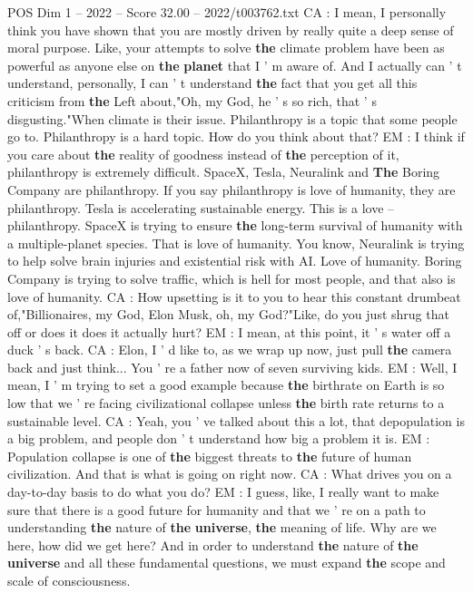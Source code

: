 \begin{textsample}{POS Dim 1 – 2022 – Score 32.00 – 2022/t003762.txt}
CA : I mean, I personally think you have shown that you are mostly driven by really quite a deep sense of moral purpose.
Like, your attempts to solve \textbf{the} climate problem have been as powerful as anyone else on \textbf{the} \textbf{planet} that I ' m aware of.
And I actually can ' t understand, personally, I can ' t understand \textbf{the} fact that you get all this criticism from \textbf{the} Left about,"Oh, my God, he ' s so rich, that ' s disgusting."When climate is their issue.
Philanthropy is a topic that some people go to.
Philanthropy is a hard topic.
How do you think about that?
EM : I think if you care about \textbf{the} reality of goodness instead of \textbf{the} perception of it, philanthropy is extremely difficult.
SpaceX, Tesla, Neuralink and \textbf{The} Boring Company are philanthropy.
If you say philanthropy is love of humanity, they are philanthropy.
Tesla is accelerating sustainable energy.
This is a love -- philanthropy.
SpaceX is trying to ensure \textbf{the} long-term survival of humanity with a multiple-planet species.
That is love of humanity.
You know, Neuralink is trying to help solve brain injuries and existential risk with AI.
Love of humanity.
Boring Company is trying to solve traffic, which is hell for most people, and that also is love of humanity.
CA : How upsetting is it to you to hear this constant drumbeat of,"Billionaires, my God, Elon Musk, oh, my God?"Like, do you just shrug that off or does it does it actually hurt?
EM : I mean, at this point, it ' s water off a duck ' s back.
CA : Elon, I ' d like to, as we wrap up now, just pull \textbf{the} camera back and just think...
You ' re a father now of seven surviving kids.
EM : Well, I mean, I ' m trying to set a good example because \textbf{the} birthrate on Earth is so low that we ' re facing civilizational collapse unless \textbf{the} birth rate returns to a sustainable level.
CA : Yeah, you ' ve talked about this a lot, that depopulation is a big problem, and people don ' t understand how big a problem it is.
EM : Population collapse is one of \textbf{the} biggest threats to \textbf{the} future of human civilization.
And that is what is going on right now.
CA : What drives you on a day-to-day basis to do what you do?
EM : I guess, like, I really want to make sure that there is a good future for humanity and that we ' re on a path to understanding \textbf{the} nature of \textbf{the} \textbf{universe}, \textbf{the} meaning of life.
Why are we here, how did we get here?
And in order to understand \textbf{the} nature of \textbf{the} \textbf{universe} and all these fundamental questions, we must expand \textbf{the} scope and scale of consciousness.

\end{textsample}
